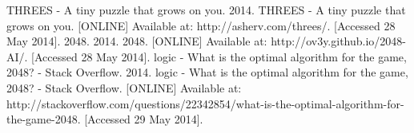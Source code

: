 \documentclass[a4paper,12pt,openany]{report}
\begin{document}

\begin{thebibliography}{20} 
	 THREES - A tiny puzzle that grows on you. 2014. THREES - A tiny puzzle that grows on you. [ONLINE] Available at: http://asherv.com/threes/. [Accessed 28 May 2014].
	 2048. 2014. 2048. [ONLINE] Available at: http://ov3y.github.io/2048-AI/. [Accessed 28 May 2014].
	 logic - What is the optimal algorithm for the game, 2048? - Stack Overflow. 2014. logic - What is the optimal algorithm for the game, 2048? - Stack Overflow. [ONLINE] Available at: http://stackoverflow.com/questions/22342854/what-is-the-optimal-algorithm-for-the-game-2048. [Accessed 29 May 2014].
\end{thebibliography} 
\end{document}
